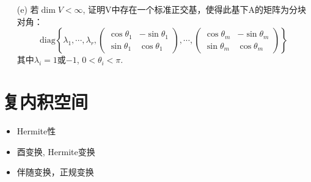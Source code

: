 \begin{itemize}
\begin{itemize}
        \item [(e)] 若$\dim V < \infty$, 证明V中存在一个标准正交基，使得此基下A的矩阵为分块对角：
        \begin{equation}
        \nonumber
        \mathrm{diag}
        \left\{
            \lambda_1, \cdots, \lambda_r,
            \begin{pmatrix}
            \cos \theta_1& -\sin \theta_1\\
            \sin \theta_1&  \cos \theta_1
            \end{pmatrix},
            \cdots,
            \begin{pmatrix}
            \cos \theta_m& -\sin \theta_m\\
            \sin \theta_m&  \cos \theta_m
            \end{pmatrix}
        \right\}
        \end{equation}
        其中$\lambda_i = 1$或$-1$, $0 < \theta_i < \pi$.
        \vspace{3cm}
        
    \end{itemize}
\end{itemize}

\section{复内积空间}
\begin{itemize}
    \item Hermite性
    \item 酉变换, Hermite变换
    \item 伴随变换，正规变换
\end{itemize}

